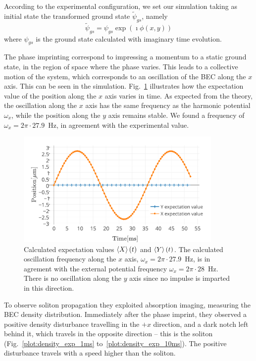 According to the experimental configuration, we set our simulation taking as initial state the transformed ground state $\tilde{\psi}_{gs}$, namely
\begin{equation}
\tilde{\psi}_{gs} = \psi_{gs} \exp(\imath \phi(x,y))
\end{equation}
where $\psi_{gs}$ is the ground state calculated with imaginary time evolution.

The phase imprinting correspond to impressing a momentum to a static ground state, in the region of space where the phase varies. This leads to a collective motion of the system, which corresponds to an oscillation of the BEC along the $x$ axis. This can be seen in the simulation. Fig.~\ref{plot:oscillation} illustrates how the expectation value of the position along the $x$ axis varies in time. As expected from the theory, the oscillation along the $x$ axis has the same frequency as the harmonic potential $\omega_x$, while the position along the $y$ axis remains stable. We found a frequency of $\omega_x = 2 \pi \cdot 27.9$~Hz, in agreement with the experimental value.
\begin{figure}[t]
    \centering
	\includegraphics[width=10cm]{Plots/oscillation.pdf}
	\caption{Calculated expectation values $\braket{X}(t)$ and $\braket{Y}(t)$. The calculated oscillation frequency along the $x$ axis, $\omega_x = 2 \pi \cdot 27.9 $~$ \mathrm{Hz}$, is in agrement with the external potential frequency $\omega_x = 2 \pi \cdot 28 $~$ \mathrm{Hz}$. There is no oscillation along the $y$ axis since no impulse is imparted in this direction.} \label{plot:oscillation}
\end{figure}

To observe soliton propagation they exploited absorption imaging, measuring the BEC density distribution. Immediately after the phase imprint, they observed a positive  density disturbance travelling in the $+x$ direction, and a dark notch left behind it, which travels in the opposite direction -- this is the soliton (Fig.~\ref{plot:density_exp_1ms} to~\ref{plot:density_exp_10ms}). The positive disturbance travels with a speed higher than the soliton.

